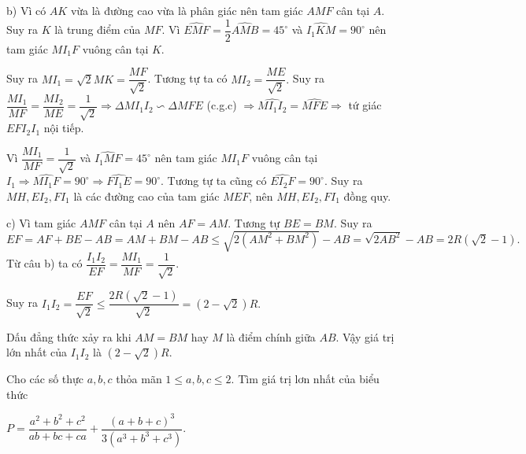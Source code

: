 \begin{ex}
{b) Vì có $AK$ vừa là đường cao vừa là phân giác nên  tam giác $AMF$ cân tại $A$. Suy ra $K$ là trung điểm của $MF$. Vì $\widehat{EMF} =\dfrac{1}{2}\widehat{AMB} = 45^\circ$ và $ \widehat{I_1KM} = 90^\circ$ nên tam giác $MI_1F$ vuông cân tại $K$. 

Suy ra $MI_1=\sqrt{2}MK = \dfrac{MF}{\sqrt{2}}$. Tương tự ta có $MI_2 = \dfrac{ME}{\sqrt{2}}.$ Suy ra $\dfrac{MI_1}{MF} = \dfrac{MI_2}{ME} = \dfrac{1}{\sqrt{2}} \Rightarrow \Delta MI_1I_2 \backsim \Delta MFE$ (c.g.c)
$\Rightarrow \widehat{MI_1I_2} = \widehat{MFE} \Rightarrow $ tứ giác $EFI_2I_1$ nội tiếp.

Vì $\dfrac{MI_1}{MF} = \dfrac{1}{\sqrt{2}}$ và $\widehat{I_1MF} = 45^\circ$ nên tam giác $MI_1F$ vuông cân tại $I_1 \Rightarrow \widehat{MI_1F} = 90^\circ \Rightarrow \widehat{FI_1E} = 90^\circ$. Tương tự ta cũng có $\widehat{EI_2F} = 90^\circ.$ Suy ra $MH,EI_2,FI_1$ là các đường cao của tam giác $MEF$, nên $MH,EI_2,FI_1$ đồng quy.

c) Vì tam giác $AMF$ cân tại $A$ nên $AF=AM$. Tương tự $BE = BM.$ Suy ra
$EF = AF+BE-AB = AM +BM -AB \le \sqrt{2(AM^2+BM^2)}-AB = \sqrt{2AB^2}-AB = 2R(\sqrt{2}-1).$ Từ câu b) ta có  $\dfrac{I_1I_2}{EF}=\dfrac{MI_1}{MF}=\dfrac{1}{\sqrt{2}}.$

Suy ra $I_1I_2 = \dfrac{EF}{\sqrt{2}} \le \dfrac{2R(\sqrt{2}-1)}{\sqrt{2}}=(2-\sqrt{2})R.$

Dấu đẳng thức xảy ra khi $AM = BM$ hay $M$ là điểm chính giữa $AB$. Vậy giá  trị lớn nhất của $I_1I_2$ là $(2-\sqrt{2})R.$
}
\end{ex}

\begin{ex}%
Cho các số thực $a,b,c$ thỏa mãn $1\le a,b,c \le 2$. Tìm giá trị lơn nhất của biểu thức 
\begin{center}
$P=\dfrac{a^2+b^2+c^2}{ab+bc+ca}+\dfrac{(a+b+c)^3}{3(a^3+b^3+c^3)}.$
\end{center}
\end{ex}

